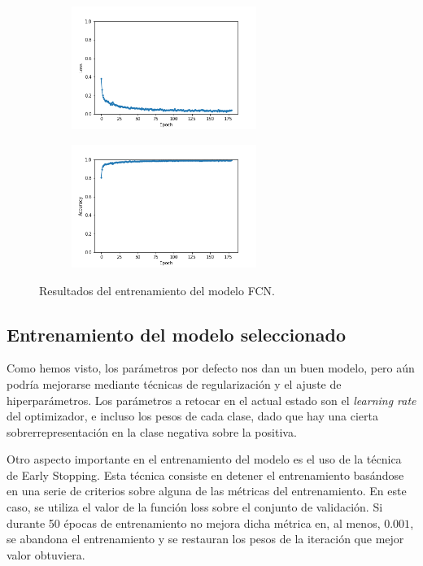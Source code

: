\begin{figure}[H]
  \centering
  \begin{subfigure}[t]{0.4\linewidth}
    \centering
    \includegraphics[height=4cm]{images/fcn_nohparam_loss.png}
  \end{subfigure}
  \begin{subfigure}[t]{0.4\linewidth}
    \centering
    \includegraphics[height=4cm]{images/fcn_nohparam_acc.png}
  \end{subfigure}
  \caption{Resultados del entrenamiento del modelo FCN.}
  \label{fig:fcn}
\end{figure}


\subsection{Entrenamiento del modelo seleccionado}

Como hemos visto, los parámetros por defecto nos dan un buen modelo, pero aún podría mejorarse mediante técnicas de regularización y el ajuste de hiperparámetros. Los parámetros a retocar en el actual estado son el \textit{learning rate} del optimizador, e incluso los pesos de cada clase, dado que hay una cierta sobrerrepresentación en la clase negativa sobre la positiva.

Otro aspecto importante en el entrenamiento del modelo es el uso de la técnica de Early Stopping. Esta técnica consiste en detener el entrenamiento basándose en una serie de criterios sobre alguna de las métricas del entrenamiento. En este caso, se utiliza el valor de la función loss sobre el conjunto de validación. Si durante 50 épocas de entrenamiento no mejora dicha métrica en, al menos, $0.001$, se abandona el entrenamiento y se restauran los pesos de la iteración que mejor valor obtuviera.

